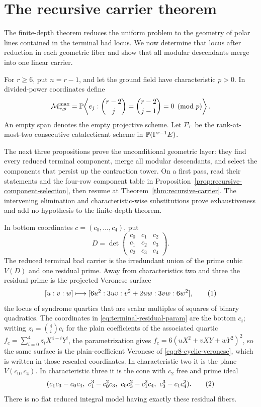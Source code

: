 \section{The recursive carrier theorem}\label{sec:recursive-carriers}

The finite-depth theorem reduces the uniform problem to the geometry of polar
lines contained in the terminal bad locus.  We now determine that locus after
reduction in each geometric fiber and show that all modular descendants merge
into one linear carrier.

For \(r\geq6\), put \(n=r-1\), and let the ground field have
characteristic \(p>0\).  In divided-power coordinates define
\begin{equation}\label{eq:maximal-lucas-carrier}
 \mathcal M^{\max}_{r,p}=
 \mathbb P\!\left\langle e_j:
 \binom{r-2}{j}=\binom{r-2}{j-1}=0\pmod p\right\rangle .
\end{equation}
An empty span denotes the empty projective scheme.  Let
\(\mathcal P_r\) be the rank-at-most-two consecutive catalecticant scheme in
\(\mathbb P(\Gamma^{r-1}E)\).

The next three propositions prove the unconditional geometric layer: they
find every reduced terminal component, merge all modular descendants, and
select the components that persist up the contraction tower.  On a first
pass, read their statements and the four-row component table in
Proposition~\ref{prop:recursive-component-selection}, then resume at
Theorem~\ref{thm:recursive-carrier}.  The intervening elimination and
characteristic-wise substitutions prove exhaustiveness and add no hypothesis
to the finite-depth theorem.

\begin{proposition}\label{prop:reduced-terminal-carrier}%
%
In bottom coordinates \(c=(c_0,\ldots,c_4)\), put
\[
 D=\det\begin{pmatrix}
 c_0&c_1&c_2\\c_1&c_2&c_3\\c_2&c_3&c_4
 \end{pmatrix}.
\]
The reduced terminal bad carrier is the irredundant union of the prime
cubic \(V(D)\) and one residual prime.  Away from characteristics two and
three the residual prime is the projected Veronese surface
\[
 [u:v:w]\longmapsto [6u^2:3uv:v^2+2uw:3vw:6w^2],
 \autoeqtag{eq:terminal-residual-param}
\]
the locus of syndrome quartics that are scalar multiples of squares of binary
quadratics.  The coordinates in \eqref{eq:terminal-residual-param} are the
bottom \(c_i\); writing \(z_i=\binom4ic_i\) for the plain coefficients of the
associated quartic \(f_c=\sum_{i=0}^4z_iX^{4-i}Y^i\), the parametrization gives
\(f_c=6(uX^2+vXY+wY^2)^2\), so the same surface is the plain-coefficient
Veronese of \eqref{eq:r8-cyclic-veronese}, which is written in those rescaled
coordinates.
In characteristic two it is the plane \(V(c_0,c_4)\).  In
characteristic three it is the cone with \(c_2\) free and prime ideal
\[
 (c_1c_3-c_0c_4,\ c_1^3-c_0^2c_3,\
   c_0c_3^2-c_1^2c_4,\ c_3^3-c_1c_4^2).
 \autoeqtag{eq:terminal-char3-prime}
\]
There is no flat reduced integral model having exactly these residual
fibers.
\end{proposition}

